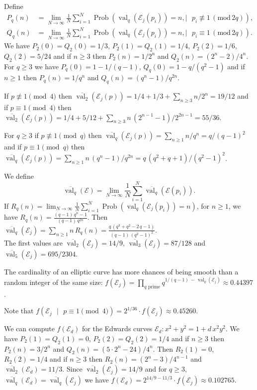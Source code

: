 \documentclass[a4paper, 11pt, pdftex]{report}
\theoremstyle{plain}
\theoremstyle{definition}
\DeclareMathOperator{\val}{val}
\DeclareMathOperator{\Prob}{Prob}
\begin{document}
Define
\begin{align*}
P_q(n) &= \lim_{N \to \infty} \frac{1}{N} \sum_{i = 1}^N \Prob(\val_q(\mathcal{E}_j(p_i)) = n,
 |\text{ } p_i \not\equiv 1\, (\text{mod}\,2q)),\\
Q_q(n) &= \lim_{N \to \infty} \frac{1}{N} \sum_{i = 1}^N \Prob(\val_q(\mathcal{E}_j(p_i)) = n,
 |\text{ } p_i \equiv 1\, (\text{mod}\,2q)).
\end{align*}
We have $P_2(0) = Q_2(0) = 1/3$, $P_2(1) = Q_2(1) = 1/4$, $P_2(2) = 1/6$, $Q_2(2) = 5/24$ and
if $n \geq 3$ then $P_2(n) = 1/2^n$ and $Q_2(n) = (2^n - 2) / 4^n$. For $q \geq 3$
we have $P_q(0) = 1 - 1/(q - 1)$, $Q_q(0) = 1 - q/(q^2 - 1)$ and if $n \geq 1$ then
$P_q(n) = 1/q^n$ and $Q_q(n) = (q^n - 1)/q^{2n}$.

If $p \not\equiv 1 \pmod{4}$ then $\overline{\val_2}(\mathcal{E}_j(p)) = 1/4 + 1/3
 + \sum_{n \geq 3} n / 2^n = 19 / 12$ and if $p \equiv 1 \pmod{4}$ then
 $\overline{\val_2}(\mathcal{E}_j(p)) = 1/4 + 5/12 + \sum_{n \geq 3} n\, (2^{n-1} - 1) / 2^{2n - 1}
 = 55 / 36$.
 
For $q \geq 3$ if $p \not\equiv 1 \pmod{q}$ then $\overline{\val_q}(\mathcal{E}_j(p))
 = \sum_{n \geq 1} n / q^n = q / (q - 1)^2$ and if $p \equiv 1 \pmod{q}$ then
$\overline{\val_q}(\mathcal{E}_j(p)) = \sum_{n \geq 1} n\, (q^n - 1)/q^{2n}
 = q\, (q^2 + q + 1) / (q^2 - 1)^2$.

We define
$$\overline{\val_q}(\mathcal{E})
 = \lim_{N \to \infty} \frac{1}{N} \sum_{i = 1}^N \overline{\val_q}(\mathcal{E}(p_i)).$$
If $R_q(n) = \lim_{N \to \infty} \frac{1}{N} \sum_{i = 1}^N \Prob(\val_q(\mathcal{E}_j(p_i)) = n)$,
for $n \geq 1$, we have $R_q(n) = \frac{(q - 1)\,q^n - 1}{(q - 1)\,q^{2n}}$.
Then $\overline{\val_q}(\mathcal{E}_j) = \sum_{n \geq 1} n\, R_q(n) =
\frac{q\, (q^3 + q^2 - 2\,q - 1)}{(q - 1)\,(q^2 - 1)^2}$.\\The first values are
$\overline{\val_2}(\mathcal{E}_j) = 14/9$, $\overline{\val_3}(\mathcal{E}_j) = 87/128$
and $\overline{\val_5}(\mathcal{E}_j) = 695/2304$.

The cardinality of an elliptic curve has more chances of being smooth than a random integer
of the same size: $f(\mathcal{E}_j) =
 \prod_{q\text{ prime}} q^{1/(q - 1)\, -\, \overline{\val_q}(\mathcal{E}_j)} \approx 0.44397$.

Note that $f(\mathcal{E}_j \text{ }|\text{ } p \equiv 1 \pmod{4}) = 2^{1/36}\cdot f(\mathcal{E}_j)
\approx 0.45260$.

We can compute $f(\mathcal{E}_d)$ for the Edwards curves $\mathcal{E}_d: x^2 + y^2 = 1 + d\,x^2y^2$.
We have $P_2(1) = Q_2(1) = 0$, $P_2(2) = Q_2(2) = 1/4$ and if $n \geq 3$ then $P_2(n) = 3/2^n$
and $Q_2(n) = (5\cdot 2^n - 24)/4^n$. Then $R_2(1) = 0$, $R_2(2) = 1/4$ and if $n \geq 3$ then
$R_2(n) = (2^n - 3)/4^{n-1}$ and $\overline{\val_2}(\mathcal{E}_d) = 11/3$. Since
$\overline{\val_2}(\mathcal{E}_j) = 14/9$ and for $q \geq 3$, $\overline{\val_q}(\mathcal{E}_d)
= \overline{\val_q}(\mathcal{E}_j)$ we have $f(\mathcal{E}_d) = 2^{14/9 - 11/3}\cdot f(\mathcal{E}_j)
\approx 0.102765$.
\end{document}
